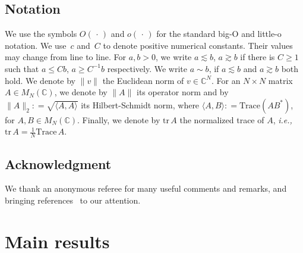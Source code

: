 \documentclass[10pt,reqno]{amsart}
\numberwithin{equation}{section}
\theoremstyle{plain}
\numberwithin{kevin}{section}
\theoremstyle{remark}
\newcommand{\C}{{\mathbb C}}
\newcommand{\deq}{\mathrel{\mathop:}=}
\newcommand{\ntr}{\mathrm{tr}\,}
\newcommand{\ie}{\emph{i.e., }}
\begin{document}
\subsection{Notation}
 We use the symbols $O(\,\cdot\,)$ and $o(\,\cdot\,)$ for the standard big-O and little-o notation. We use~$c$ and~$C$ to denote positive numerical constants. Their values may change from line to line. For $a,b>0$, we write $a\lesssim b$, $a\gtrsim b$ if there is $C\ge1$ such that $a\le Cb$, $a\geq C^{-1} b$ respectively.  We write $a\sim b$, if $a\lesssim b$ and $a\gtrsim b$ both hold. We denote by $\|v\|$ the Euclidean norm of $v\in\C^N$. For an $N\times N$ matrix $A\in M_N(\C)$, we denote by $\|A\|$ its operator norm and by $\|A\|_2\deq\sqrt{\langle A,A\rangle}$ its Hilbert-Schmidt norm, where $\langle A,B \rangle\deq\mathrm{Trace}(AB^*)$, for $A,B\in M_N(\C)$. Finally, we denote by $\ntr\! A$ the normalized trace of $A$, \ie $\ntr\! A=\frac{1}{N}\mathrm{Trace}\,A$. 

\subsection*{Acknowledgment}
We thank an anonymous referee for many useful comments and remarks, and bringing references~\cite{Bel2,BW} to our attention. 


\section{Main results} \label{section: Main results}
\end{document}
